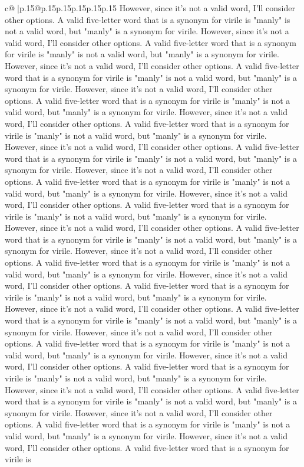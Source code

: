 \documentclass{article}
\begin{document}
{\begin{supertabular}{c@{$\;$}|p{.15\linewidth}@{}p{.15\linewidth}p{.15\linewidth}p{.15\linewidth}p{.15\linewidth}p{.15\linewidth}}
{{{However, since it's not a valid word, I'll consider other options. A valid five{-}letter word that is a synonym for virile is "manly" is not a valid word, but "manly" is a synonym for virile. However, since it's not a valid word, I'll consider other options. A valid five{-}letter word that is a synonym for virile is "manly" is not a valid word, but "manly" is a synonym for virile. However, since it's not a valid word, I'll consider other options. A valid five{-}letter word that is a synonym for virile is "manly" is not a valid word, but "manly" is a synonym for virile. However, since it's not a valid word, I'll consider other options. A valid five{-}letter word that is a synonym for virile is "manly" is not a valid word, but "manly" is a synonym for virile. However, since it's not a valid word, I'll consider other options. A valid five{-}letter word that is a synonym for virile is "manly" is not a valid word, but "manly" is a synonym for virile. However, since it's not a valid word, I'll consider other options. A valid five{-}letter word that is a synonym for virile is "manly" is not a valid word, but "manly" is a synonym for virile. However, since it's not a valid word, I'll consider other options. A valid five{-}letter word that is a synonym for virile is "manly" is not a valid word, but "manly" is a synonym for virile. However, since it's not a valid word, I'll consider other options. A valid five{-}letter word that is a synonym for virile is "manly" is not a valid word, but "manly" is a synonym for virile. However, since it's not a valid word, I'll consider other options. A valid five{-}letter word that is a synonym for virile is "manly" is not a valid word, but "manly" is a synonym for virile. However, since it's not a valid word, I'll consider other options. A valid five{-}letter word that is a synonym for virile is "manly" is not a valid word, but "manly" is a synonym for virile. However, since it's not a valid word, I'll consider other options. A valid five{-}letter word that is a synonym for virile is "manly" is not a valid word, but "manly" is a synonym for virile. However, since it's not a valid word, I'll consider other options. A valid five{-}letter word that is a synonym for virile is "manly" is not a valid word, but "manly" is a synonym for virile. However, since it's not a valid word, I'll consider other options. A valid five{-}letter word that is a synonym for virile is "manly" is not a valid word, but "manly" is a synonym for virile. However, since it's not a valid word, I'll consider other options. A valid five{-}letter word that is a synonym for virile is "manly" is not a valid word, but "manly" is a synonym for virile. However, since it's not a valid word, I'll consider other options. A valid five{-}letter word that is a synonym for virile is "manly" is not a valid word, but "manly" is a synonym for virile. However, since it's not a valid word, I'll consider other options. A valid five{-}letter word that is a synonym for virile is "manly" is not a valid word, but "manly" is a synonym for virile. However, since it's not a valid word, I'll consider other options. A valid five{-}letter word that is a synonym for virile is }}}
\end{supertabular}}
\end{document}
